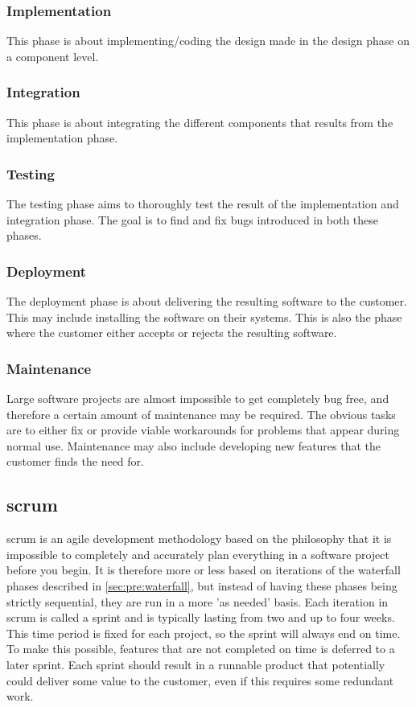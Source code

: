 \subsubsection{Implementation}
This phase is about implementing/coding the design made in the design phase on
a component level.

\subsubsection{Integration}
This phase is about integrating the different components that results from the
implementation phase.

\subsubsection{Testing}
The testing phase aims to thoroughly test the result of the implementation and
integration phase. The goal is to find and fix bugs introduced in both these
phases.

\subsubsection{Deployment}
The deployment phase is about delivering the resulting software to the
customer. This may include installing the software on their systems. This is
also the phase where the customer either accepts or rejects the resulting
software.

\subsubsection{Maintenance}
Large software projects are almost impossible to get completely bug free, and
therefore a certain amount of maintenance may be required. The obvious tasks
are to either fix or provide viable workarounds for problems that appear during
normal use. Maintenance may also include developing new features that the
customer finds the need for.

\subsection{\Gls{scrum}}
\label{sec:pre:scrum}
\Gls{scrum} is an agile development methodology based on the philosophy that it is
impossible to completely and accurately plan everything in a software project
before you begin. It is therefore more or less based on iterations of the
waterfall phases described in \autoref{sec:pre:waterfall}, but instead of
having these phases being strictly sequential, they are run in a more
'as needed' basis. Each iteration in \Gls{scrum} is called a sprint and is typically
lasting from two and up to four weeks. This time period is fixed for each
project, so the sprint will always end on time. To make this possible, features
that are not completed on time is deferred to a later sprint. Each sprint
should result in a runnable product that potentially could deliver some value
to the customer, even if this requires some redundant work.

